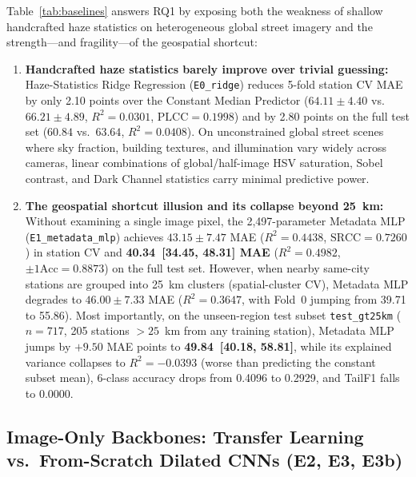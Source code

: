 \documentclass[conference]{IEEEtran}
\begin{document}
Table~\ref{tab:baselines} answers RQ1 by exposing both the weakness of shallow
handcrafted haze statistics on heterogeneous global street imagery and the
strength---and fragility---of the geospatial shortcut:
\begin{enumerate}
  \item \textbf{Handcrafted haze statistics barely improve over trivial
        guessing:} Haze-Statistics Ridge Regression (\texttt{E0\_ridge}) reduces
        5-fold station CV MAE by only 2.10 points over the Constant Median
        Predictor ($64.11 \pm 4.40$ vs.\ $66.21 \pm 4.89$, $R^2 = 0.0301$,
        $\text{PLCC} = 0.1998$) and by 2.80 points on the full test set ($60.84$
        vs.\ $63.64$, $R^2 = 0.0408$). On unconstrained global street scenes
        where sky fraction, building textures, and illumination vary widely
        across cameras, linear combinations of global/half-image HSV saturation,
        Sobel contrast, and Dark Channel statistics carry minimal predictive
        power.
  \item \textbf{The geospatial shortcut illusion and its collapse beyond 25~km:}
        Without examining a single image pixel, the 2,497-parameter Metadata MLP
        (\texttt{E1\_metadata\_mlp}) achieves $43.15 \pm 7.47$ MAE
        ($R^2 = 0.4438$, $\text{SRCC} = 0.7260$) in station CV and
        \textbf{40.34~[34.45, 48.31] MAE} ($R^2 = 0.4982$,
        $\pm 1\text{Acc} = 0.8873$) on the full test set. However, when nearby
        same-city stations are grouped into 25~km clusters (spatial-cluster CV),
        Metadata MLP degrades to $46.00 \pm 7.33$ MAE ($R^2 = 0.3647$, with
        Fold~0 jumping from 39.71 to 55.86). Most importantly, on the
        unseen-region test subset \texttt{test\_gt25km} ($n = 717$, 205 stations
        $> 25$~km from any training station), Metadata MLP jumps by $+9.50$ MAE
        points to \textbf{49.84~[40.18, 58.81]}, while its explained variance
        collapses to \textbf{$R^2 = -0.0393$} (worse than predicting the
        constant subset mean), 6-class accuracy drops from 0.4096 to 0.2929, and
        TailF1 falls to 0.0000.
\end{enumerate}

\subsection{
  Image-Only Backbones: Transfer Learning vs.\ From-Scratch Dilated CNNs (E2,
  E3, E3b)
}
\label{subsec:results_backbones}
\end{document}

